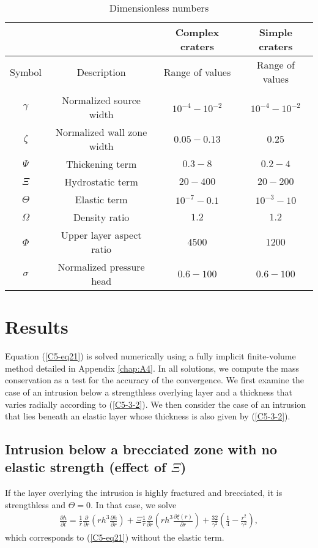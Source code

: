 \begin{table}[h!]
  \caption{Dimensionless numbers}
  \centering
  \begin{tabular}{c|c|c|c}
    &&Complex craters&Simple craters \\
    \hline
    Symbol& Description & Range of values & Range of values \\
    \hline
    &&\\
    $\gamma$&Normalized source width& $10^{-4}-10^{-2}$ &$10^{-4}-10^{-2}$ \\
    $\zeta$& Normalized wall zone width  & $0.05-0.13$&$0.25$\\
    $\Psi$&Thickening term & $0.3-8$&$0.2-4$\\
    $\Xi$& Hydrostatic term & $20-400$&$20-200$\\
    $\Theta$ &Elastic term & $10^{-7}-0.1$&$10^{-3}-10$\\
    $\Omega$ & Density ratio & $1.2$ &$1.2$\\
    $\Phi$ & Upper layer aspect ratio & $4500$ &$1200 $\\
    $\sigma$&Normalized pressure head& $0.6-100$ & $0.6-100$ 
                                                   \label{C5-tab3}
  \end{tabular} 
\end{table}
	 
	
\section{Results}
	
Equation (\ref{C5-eq21}) is solved  numerically using a fully implicit
finite-volume  method  detailed  in Appendix  \ref{chap:A4}.   In  all
solutions, we compute the mass conservation as a test for the accuracy
of the convergence. We first examine  the case of an intrusion below a
strengthless  overlying layer  and  a thickness  that varies  radially
according to (\ref{C5-3-2}). We then consider the case of an intrusion
that lies  beneath an elastic layer  whose thickness is also  given by
(\ref{C5-3-2}).
	
\subsection{Intrusion below a brecciated zone with no elastic strength
  (effect of $\Xi$)}
\label{C5-Strengthless_Layer1}
If  the  layer  overlying  the   intrusion  is  highly  fractured  and
brecciated, it is strengthless and $\Theta=0$.  In that case, we solve
\begin{eqnarray}
  \label{C5-eq22}
  \frac{\partial h}{\partial t}=\frac{1}{r} \frac{\partial}{\partial r}\left (rh^{3} \frac{\partial h}{\partial r} \right)+ \Xi \frac{1}{r} \frac{\partial}{\partial r}\left ( rh^{3}\frac{\partial \xi(r)}{\partial r}\right )+\frac{32}{\gamma^{2}} \left(\frac{1}{4}-\frac{r^{2}}{\gamma^{2}}\right),
\end{eqnarray}
which corresponds to (\ref{C5-eq21}) without the elastic term.


